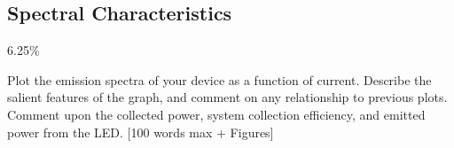 \subsection{Spectral Characteristics}
\label{sec:test:spectral}

6.25\%

Plot the emission spectra of your device as a function of current. Describe the salient features of the graph, and comment on any relationship to previous plots. Comment upon the collected power, system collection efficiency, and emitted power from the LED. [100 words max + Figures]



